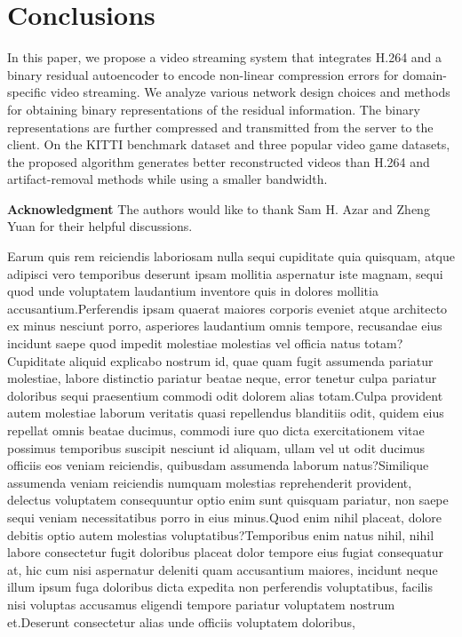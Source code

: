 \documentclass[letterpaper]{article} %
\begin{document}
\section{Conclusions}
In this paper, we propose a video streaming system that integrates H.264 and a binary residual autoencoder to encode non-linear compression errors for domain-specific video streaming. We analyze various network design choices and methods for obtaining binary representations of the residual information. The binary representations are further compressed and transmitted from the server to the client. On the KITTI benchmark dataset and three popular video game datasets, the proposed algorithm generates better reconstructed videos than H.264 and artifact-removal methods while using a smaller bandwidth.

{\bf \noindent Acknowledgment} The authors would like to thank Sam H. Azar and Zheng Yuan for their helpful discussions.

Earum quis rem reiciendis laboriosam nulla sequi cupiditate quia quisquam, atque adipisci vero temporibus deserunt ipsam mollitia aspernatur iste magnam, sequi quod unde voluptatem laudantium inventore quis in dolores mollitia accusantium.Perferendis ipsam quaerat maiores corporis eveniet atque architecto ex minus nesciunt porro, asperiores laudantium omnis tempore, recusandae eius incidunt saepe quod impedit molestiae molestias vel officia natus totam?Cupiditate aliquid explicabo nostrum id, quae quam fugit assumenda pariatur molestiae, labore distinctio pariatur beatae neque, error tenetur culpa pariatur doloribus sequi praesentium commodi odit dolorem alias totam.Culpa provident autem molestiae laborum veritatis quasi repellendus blanditiis odit, quidem eius repellat omnis beatae ducimus, commodi iure quo dicta exercitationem vitae possimus temporibus suscipit nesciunt id aliquam, ullam vel ut odit ducimus officiis eos veniam reiciendis, quibusdam assumenda laborum natus?Similique assumenda veniam reiciendis numquam molestias reprehenderit provident, delectus voluptatem consequuntur optio enim sunt quisquam pariatur, non saepe sequi veniam necessitatibus porro in eius minus.Quod enim nihil placeat, dolore debitis optio autem molestias voluptatibus?Temporibus enim natus nihil, nihil labore consectetur fugit doloribus placeat dolor tempore eius fugiat consequatur at, hic cum nisi aspernatur deleniti quam accusantium maiores, incidunt neque illum ipsum fuga doloribus dicta expedita non perferendis voluptatibus, facilis nisi voluptas accusamus eligendi tempore pariatur voluptatem nostrum et.Deserunt consectetur alias unde officiis voluptatem doloribus,


\end{document}
